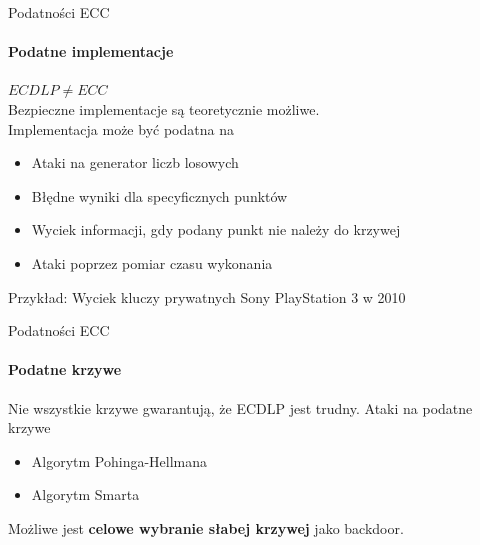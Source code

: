 \begin{frame}{Podatności ECC}
\framesubtitle{Podatne implementacje}
\textbf{$ECDLP \neq ECC$} \\
\pause
Bezpieczne implementacje są teoretycznie możliwe. \\
\pause
Implementacja może być podatna na \cite{SafeCurves}
\begin{itemize}
    \item Ataki na generator liczb losowych
    \item Błędne wyniki dla specyficznych punktów
    \item Wyciek informacji, gdy podany punkt nie należy do krzywej
    \item Ataki poprzez pomiar czasu wykonania
\end{itemize}
\pause
\vspace{3mm}
Przykład: Wyciek kluczy prywatnych Sony PlayStation 3 w 2010 \cite{ConsoleHacking2010}
\end{frame}

\begin{frame}{Podatności ECC}
\framesubtitle{Podatne krzywe}
Nie wszystkie krzywe gwarantują, że ECDLP jest trudny.
Ataki na podatne krzywe \cite{WeakCurvesInEllipticCurveCryptography}
\begin{itemize}
    \item Algorytm Pohinga-Hellmana
    \item Algorytm Smarta
\end{itemize}
\pause
\vspace{3mm}
Możliwe jest \textbf{celowe wybranie słabej krzywej} jako backdoor.
\end{frame}

